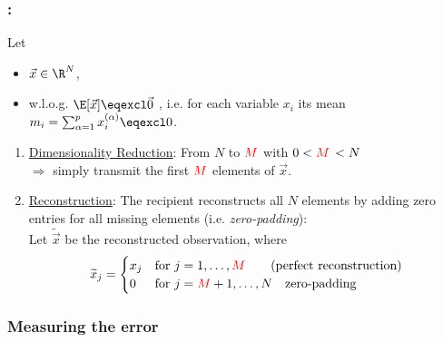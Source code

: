 \begin{frame}\frametitle{\subsecname:~\subsubsecname}

Let
\svspace{-5mm}
\begin{itemize}
\item[]$\vec x \in \R^N$,\\
\item[] w.l.o.g. $\E[\vec x] \eqexcl \vec 0$ \notesonly{\\

}, i.e. for each variable $x_i$ its mean $m_i = \sum_{\alpha=1}^{p} x_i^{(\alpha)} \eqexcl 0$.
\end{itemize}

\pause

\begin{enumerate}
\item \underline{Dimensionality Reduction}: From $N$ to $\color{red}M$ with $0 < {\color{red}M}\, < N$\\
$\Rightarrow$ simply transmit the first $\color{red}M$ elements of $\vec x$. 
\pause
\item \underline{Reconstruction}: The recipient reconstructs all $N$ elements by adding zero entries for all missing elements (i.e. \textit{zero-padding}):\\
Let $\widetilde{\vec{x}}$ be the reconstructed observation, where\\ 
 
 \begin{equation}
 \widetilde{x}_j = \begin{cases} 
      {x}_j & \text{for}~j=1,\ldots,{\color{red}M} \qquad \text{(perfect reconstruction)} \\
      0 & \text{for}~j={\color{red}M}+1,\ldots,N \quad \text{zero-padding} 
   \end{cases}
 \end{equation}
\end{enumerate}


\end{frame}

\subsubsection{Measuring the error}\label{sec:objective}

